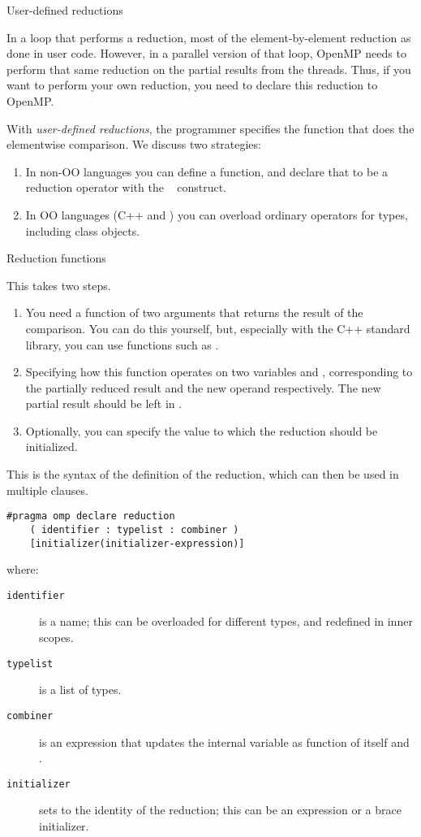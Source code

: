  {User-defined reductions}

In a loop that performs a reduction,
most of the element-by-element reduction as done in user code.
However, in a parallel version of that loop,
OpenMP needs to perform that same reduction on the partial results
from the threads.
Thus, if you want to perform your own reduction,
you need to declare this reduction to OpenMP.

With \emph{user-defined reductions}, the programmer specifies the
function that does the elementwise comparison.
We discuss two strategies:
\begin{enumerate}
\item In non-\ac{OO} languages you can define a function,
  and declare that to be a reduction operator with the
  ~ construct.
\item In \ac{OO} languages (C++ and )
  you can overload ordinary operators for types, including class objects.
\end{enumerate}

 {Reduction functions}

This takes two steps.
\begin{enumerate}
\item You need a function of two arguments that returns the result of
  the comparison. You can do this yourself, but, especially with the
  C++ standard library, you can use functions such as .
\item Specifying how this function operates on two variables
   and , corresponding to the
  partially reduced result and the new operand respectively. The new
  partial result should be left in .
\item Optionally, you can specify the value to which the reduction
  should be initialized.
\end{enumerate}

This is the syntax of the definition of the reduction, which can then
be used in multiple  clauses.
\begin{lstlisting}
#pragma omp declare reduction 
    ( identifier : typelist : combiner )
    [initializer(initializer-expression)]
\end{lstlisting}
where:
\begin{description}
  \item[\texttt{identifier}] is a name; this can be overloaded for
    different types, and redefined in inner scopes.
  \item[\texttt{typelist}] is a list of types.
  \item[\texttt{combiner}] is an expression that updates the internal
    variable  as function of itself and .
  \item[\texttt{initializer}] sets  to the
    identity of the reduction; this
    can be an expression or a brace initializer.
\end{description}

